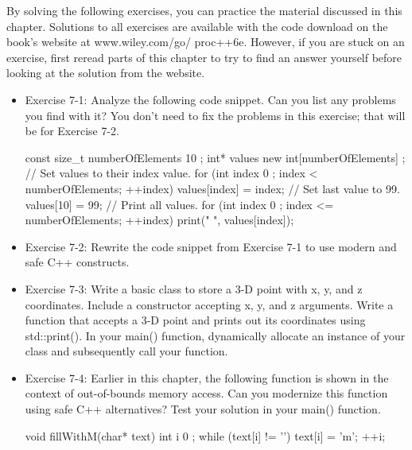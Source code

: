 By solving the following exercises, you can practice the material discussed in this chapter. Solutions to all exercises are available with the code download on the book’s website at www.wiley.com/go/ proc++6e. However, if you are stuck on an exercise, first reread parts of this chapter to try to find an answer yourself before looking at the solution from the website.


\begin{itemize}
\item
Exercise 7-1: Analyze the following code snippet. Can you list any problems you find with it? You don’t need to fix the problems in this exercise; that will be for Exercise 7-2.

\begin{cpp}
const size_t numberOfElements { 10 };
int* values { new int[numberOfElements] };
// Set values to their index value.
for (int index { 0 }; index < numberOfElements; ++index) {
    values[index] = index;
}
// Set last value to 99.
values[10] = 99;
// Print all values.
for (int index { 0 }; index <= numberOfElements; ++index) {
    print("{} ", values[index]);
}
\end{cpp}

\item
Exercise 7-2: Rewrite the code snippet from Exercise 7-1 to use modern and safe C++ constructs.

\item
Exercise 7-3: Write a basic class to store a 3-D point with x, y, and z coordinates. Include a constructor accepting x, y, and z arguments. Write a function that accepts a 3-D point and prints out its coordinates using std::print(). In your main() function, dynamically allocate an instance of your class and subsequently call your function.

\item
Exercise 7-4: Earlier in this chapter, the following function is shown in the context of out-of-bounds memory access. Can you modernize this function using safe C++ alternatives? Test your solution in your main() function.

\begin{cpp}
void fillWithM(char* text)
{
    int i { 0 };
    while (text[i] != '\0') {
        text[i] = 'm';
        ++i;
    }
}
\end{cpp}
\end{itemize}